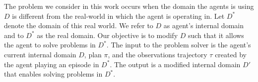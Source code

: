 \documentclass[letterpaper]{article} %
\newcommand{\tuple}[1]{\ensuremath{\left \langle #1 \right \rangle }} %
\newcommand{\hydra}{\textsc{Hydra}\xspace} %
\newtheorem{definition}{Definition} %
\begin{document}
The problem we consider in this work occurs when the domain the agents is using $D$ is different from the real-world in which the agent is operating in. Let $D^*$ denote the domain of this real world. We refer to $D$ as agent's internal domain and to $D^*$ as the real domain. Our objective is to modify $D$ such that it allows the agent to solve problems in $D^*$.
The input to the problem solver is the agent's current internal domain $D$, plan $\pi$, and the observations trajectory $\tau$ created by the agent playing an episode in $D^*$.
The output is a modified internal domain $D'$ that enables solving problems in $D^*$.







\end{document}
